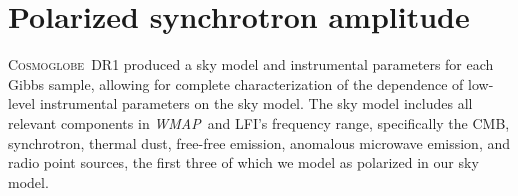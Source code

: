 \documentclass[twocolumn]{../../common/aa}
\def\WMAP{\emph{WMAP}}
\newcommand{\cosmoglobe}{\textsc{Cosmoglobe}}
\begin{document}
\section{Polarized synchrotron amplitude}
\label{sec:pol_amp}




%




\cosmoglobe\ DR1 produced a sky model and instrumental parameters for each Gibbs sample, allowing for complete characterization of the dependence of low-level instrumental parameters on the sky model. The sky model includes all relevant components in \WMAP\ and LFI's frequency range, specifically the CMB, synchrotron, thermal dust, free-free emission, anomalous microwave emission, and radio point sources, the first three of which we model as polarized in our sky model.
\end{document}
